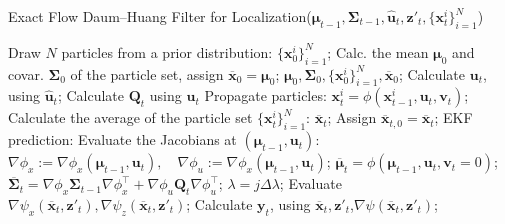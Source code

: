 \begin{algorithm}
    \caption{Exact Flow Daum--Huang Filter for Localization($\boldsymbol{\mu}_{t-1},\mathbf{\Sigma}_{t-1},\hat{\mathbf{u}}_t,\mathbf{z}'_t,\{\mathbf{x}_t^i\}_{i=1}^{N}$)}\label{alg:edh-loc}
    \begin{algorithmic}[1]
         
        \State Draw $N$ particles from a prior distribution: $\{\mathbf{x}_0^i\}_{i=1}^{N}$;
        \State Calc. the mean $\boldsymbol\mu_0$ and covar. $\boldsymbol\Sigma_0$ of the particle set, assign $\overline{\mathbf{x}}_0 = \boldsymbol{\mathbf{\mu}}_0$;
        \State\Return $\boldsymbol{\mu}_0,\boldsymbol{\Sigma}_0,\{\mathbf{x}_0^i\}_{i=1}^{N},\overline{\mathbf{x}}_0$;
        \EndIf
        \State Calculate $\mathbf{u}_t$, using $\hat{\mathbf{u}}_t$; \Comment{\eqref{eq:odom-raw-input}-\eqref{eq:odom-delta-input}}
        \State Calculate $\mathbf{Q}_t$ using $\mathbf{u}_t$
        \Comment{\eqref{eq:control-covar}}
        \State Propagate particles: $\mathbf{x}_t^{i} = \phi(\mathbf{x}_{t-1}^{i},\mathbf{u}_t,\mathbf{v}_t)$;
        \Comment{\eqref{eq:prop-x}-\eqref{eq:prop-theta}}
        \State Calculate the average of the particle set $\{\mathbf{x}_t^i\}_{i=1}^{N}$: $\overline{\mathbf{x}}_t$;
        \State Assign $\overline{{\mathbf{x}}}_{t,0} = \overline{\mathbf{x}}_t$;
        \State EKF prediction:
        \State\indent Evaluate the Jacobians at $(\boldsymbol{\mu}_{t-1},\mathbf{u}_t)$:
        \Comment{\eqref{eq:motmodel-jacobi-x}-\eqref{eq:motmodel-jacobi-u}}
        \State\indent\indent $\nabla\phi_x := \nabla\phi_x(\boldsymbol{\mu}_{t-1},\mathbf{u}_t),\quad \nabla\phi_u := \nabla\phi_x(\boldsymbol{\mu}_{t-1},\mathbf{u}_t)$;
        \State\indent$\overline{\boldsymbol{\mu}}_t = \phi(\boldsymbol{\mu}_{t-1},\mathbf{u}_t,\mathbf{v}_t = 0)$;
        \State\indent
        $\overline{\mathbf{\Sigma}}_t = \nabla \phi_x\mathbf{\Sigma}_{t-1}\nabla \phi_x^{\top}
            +\nabla \phi _u\mathbf{Q}_t \nabla \phi_u^{\top}$;
         
        \State $\lambda = j\Delta\lambda$;
        \State Evaluate $\nabla\psi_x(\overline{\mathbf{x}}_t,\mathbf{z}'_t),\nabla\psi_z(\overline{\mathbf{x}}_t,\mathbf{z}'_t)$;
        \Comment{\eqref{eq:measmodel-jacobi-x}-\eqref{eq:measmodel-jacobi-z}}
        \State Calculate $\mathbf{y}_t$, using $\overline{\mathbf{x}}_t,\mathbf{z}'_t$,$\nabla\psi(\overline{\mathbf{x}}_t,\mathbf{z}'_t)$; \Comment{\eqref{eq:edh-implicit-y},\eqref{eq:observation-function}}

\end{algorithmic}
\end{algorithm}
